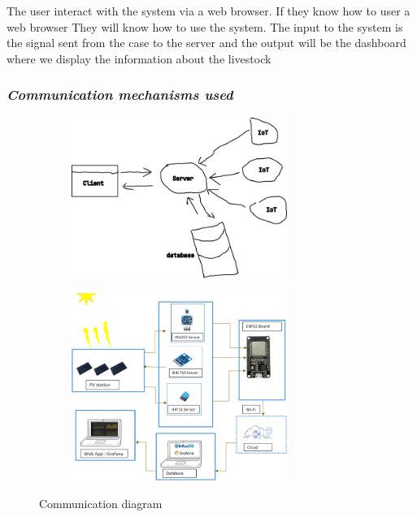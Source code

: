 The user interact with the system via a web browser. If they know how to user a web browser
They will know how to use the system. The input to the system is the signal sent from the case
to the server and the output will be the dashboard where we display the information about
the livestock


\subsubsection{\textit{Communication mechanisms used}}
\begin{figure}[htbp]
\centering
    \begin{subfigure}[b]{7cm}
        \centering
        \includegraphics[width=7cm]{cc.png} %
        \label{fig2:sub1}
    \end{subfigure}
\quad
    \begin{subfigure}[b]{7cm}
        \centering
        \includegraphics[width=7cm]{ccc.png} %
        \label{fig2:sub2}
    \end{subfigure}
\caption{
Communication diagram
}
\label{fig:fig2} %
\end{figure}

